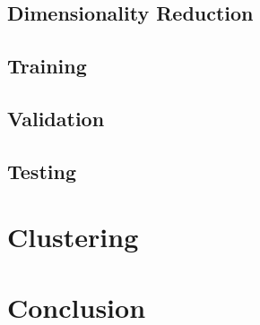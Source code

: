 \documentclass[12pt]{article}
\begin{document}
\subsection{Dimensionality Reduction}


\subsection{Training}

\subsection{Validation}

\subsection{Testing}
\section{Clustering}


\section{Conclusion}


\singlespacing



\end{document}
